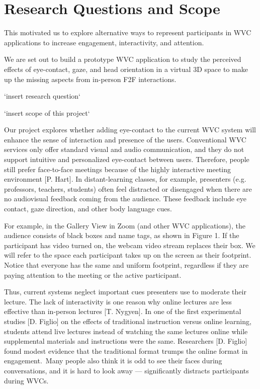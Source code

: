 \section{Research Questions and Scope}

This motivated us to explore alternative ways to represent participants in WVC applications to increase engagement, interactivity, and attention. 

We are set out to build a prototype WVC application to study the perceived effects of eye-contact, gaze, and head orientation in a virtual 3D space to make up the missing aspects from in-person F2F interactions.

`insert research question`

`insert scope of this project`

Our project explores whether adding eye-contact to the current WVC system will enhance the sense of interaction and presence of the users. Conventional WVC services only offer standard visual and audio communication, and they do not support intuitive and personalized eye-contact between users. Therefore, people still prefer face-to-face meetings because of the highly interactive meeting environment [P. Hart].
In distant-learning classes, for example, presenters (e.g. professors, teachers, students) often feel distracted or disengaged when there are no audiovisual feedback coming from the audience. These feedback include eye contact, gaze direction, and other body language cues.

For example, in the Gallery View in Zoom (and other WVC applications), the audience consists of black boxes and name tags, as shown in Figure 1. If the participant has video turned on, the webcam video stream replaces their box. We will refer to the space each participant takes up on the screen as their footprint. Notice that everyone has the same and uniform footprint, regardless if they are paying attention to the meeting or the active participant.

Thus, current systems neglect important cues presenters use to moderate their lecture. The lack of interactivity is one reason why online lectures are less effective than in-person lectures [T. Nygyen]. In one of the first experimental studies [D. Figlio] on the effects of traditional instruction versus online learning, students attend live lectures instead of watching the same lectures online while supplemental materials and instructions were the same. Researchers [D. Figlio] found modest evidence that the traditional format trumps the online format in engagement. Many people also think it is odd to see their faces during conversations, and it is hard to look away — significantly distracts participants during WVCs.

